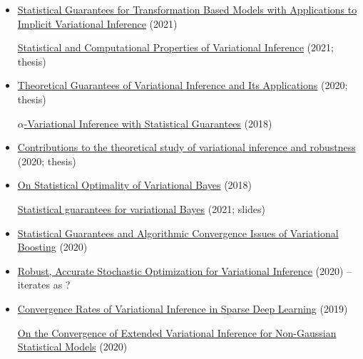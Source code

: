 \documentclass[10pt]{article}
\begin{document}
\begin{itemize}
\item
\href{https://proceedings.mlr.press/v130/plummer21a/plummer21a.pdf}{Statistical Guarantees for Transformation Based Models with Applications to Implicit Variational Inference} (2021)

\href{https://oaktrust.library.tamu.edu/bitstream/handle/1969.1/195122/PLUMMER-DISSERTATION-2021.pdf?sequence=1&isAllowed=y}{Statistical and Computational Properties of Variational Inference} (2021; thesis)
\item
\href{https://knowledge.uchicago.edu/record/2221?ln=en}{Theoretical Guarantees of Variational Inference and Its Applications} (2020; thesis)

\href{https://arxiv.org/pdf/1710.03266.pdf}{$\alpha$-Variational Inference with Statistical Guarantees} (2018)
\item
\href{https://tel.archives-ouvertes.fr/tel-02893465/document}{Contributions to the theoretical study of variational inference and robustness} (2020; thesis)
\item
\href{https://par.nsf.gov/servlets/purl/10180931}{On Statistical Optimality of Variational Bayes} (2018)

\href{https://math.unm.edu/~skripka/workshop_high_dim/Anirban_Talks.pdf}{Statistical guarantees for variational Bayes} (2021; slides)
\item
\href{https://arxiv.org/pdf/2010.09540.pdf}{Statistical Guarantees and Algorithmic Convergence Issues of Variational Boosting} (2020)
\item
\href{https://proceedings.neurips.cc/paper/2020/file/7cac11e2f46ed46c339ec3d569853759-Paper.pdf}{Robust, Accurate Stochastic Optimization for Variational Inference} (2020) -- iterates as \mcmc?
\item
\href{https://arxiv.org/pdf/1908.04847.pdf}{Convergence Rates of Variational Inference in Sparse Deep Learning} (2019)

\href{https://arxiv.org/pdf/1902.05068.pdf}{On the Convergence of Extended Variational Inference for Non-Gaussian Statistical Models} (2020)

\end{itemize}


\newpage



\end{document}
